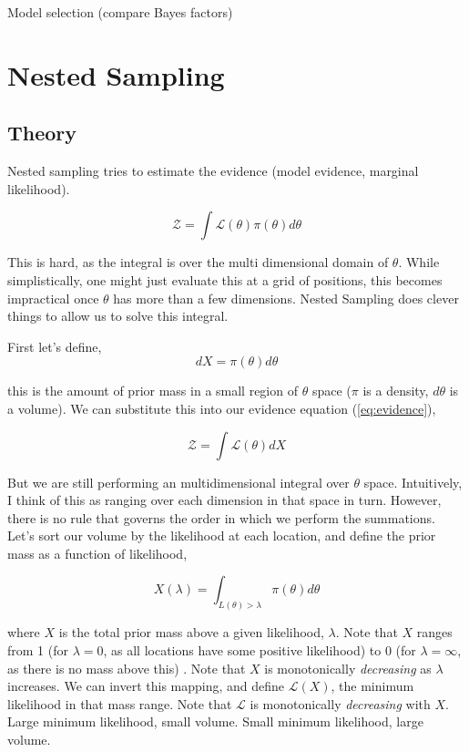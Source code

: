 \documentclass[useAMS,usenatbib,onecolumn]{mnras}
\begin{document}
Model selection (compare Bayes factors)

\section{Nested Sampling}

\subsection{Theory}

Nested sampling tries to estimate the evidence (model evidence, marginal likelihood).

\begin{equation}
    \mathcal{Z} = \int \mathcal{L}(\theta) \pi(\theta) d\theta
    \label{eq:evidence}
\end{equation}

This is hard, as the integral is over the multi dimensional domain of $\theta$. While simplistically, one might just evaluate this at a grid of positions, this becomes impractical once $\theta$ has more than a few dimensions. Nested Sampling does clever things to allow us to solve this integral.

First let's define,
\begin{equation}
    dX = \pi(\theta) d\theta
\end{equation}

\noindent this is the amount of prior mass in a small region of $\theta$ space ($\pi$ is a density, $d\theta$ is a volume). We can substitute this into our evidence equation (\autoref{eq:evidence}),

\begin{equation}
    \mathcal{Z} = \int \mathcal{L}(\theta) dX
\end{equation}


\noindent But we are still performing an multidimensional integral over $\theta$ space. Intuitively, I think of this as ranging over each dimension in that space in turn. However, there is no rule that governs the order in which we perform the summations. Let's sort our volume by the likelihood at each location, and define the prior mass as a function of likelihood,

\begin{equation}
    X(\lambda) = \int_{L(\theta) > \lambda} \pi(\theta) d\theta
\end{equation}

\noindent where $X$ is the total prior mass above a given likelihood, $\lambda$. Note that $X$ ranges from 1 (for $\lambda = 0$, as all locations have some positive likelihood) to $0$ (for $\lambda = \infty$, as there is no mass above this) . Note that $X$ is monotonically {\em decreasing} as $\lambda$ increases.
We can invert this mapping, and define $\mathcal{L}(X)$, the minimum likelihood in that mass range. Note that $\mathcal{L}$ is monotonically {\em decreasing} with $X$.
Large minimum likelihood, small volume. Small minimum likelihood, large volume.
\end{document}
